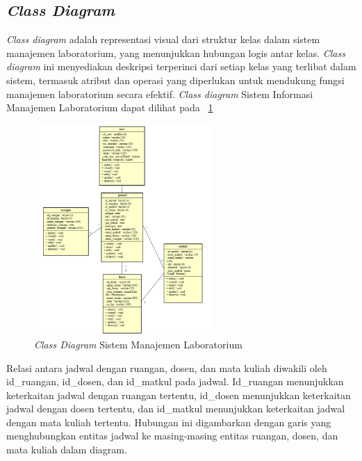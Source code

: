\subsection{\textit{Class Diagram}}
\textit{Class diagram} adalah representasi visual dari struktur kelas dalam sistem manajemen laboratorium, yang menunjukkan hubungan logis antar kelas. \textit{Class diagram} ini menyediakan deskripsi terperinci dari setiap kelas yang terlibat dalam sistem, termasuk atribut dan operasi yang diperlukan untuk mendukung fungsi manajemen laboratorium secara efektif. \textit{Class diagram} Sistem Informasi Manajemen Laboratorium dapat dilihat pada \pic~\ref{class-diagram}

\begin{figure}
	\centering
	\includegraphics[width=0.6\textwidth]{konten/gambar/class-diagram.png}
	\caption{\textit{Class Diagram} Sistem Manajemen Laboratorium}
	\label{class-diagram}
\end{figure}

Relasi antara jadwal dengan ruangan, dosen, dan mata kuliah diwakili oleh id\_ruangan, id\_dosen, dan id\_matkul pada jadwal. Id\_ruangan menunjukkan keterkaitan jadwal dengan ruangan tertentu, id\_dosen menunjukkan keterkaitan jadwal dengan dosen tertentu, dan id\_matkul menunjukkan keterkaitan jadwal dengan mata kuliah tertentu. Hubungan ini digambarkan dengan garis yang menghubungkan entitas jadwal ke masing-masing entitas ruangan, dosen, dan mata kuliah dalam diagram.

